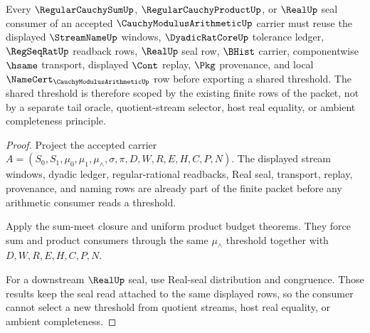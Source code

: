 \begin{theorem}
\label{thm:cauchy-modulus-arithmetic-scope-window-reuse}
Every $\RegularCauchySumUp$, $\RegularCauchyProductUp$, or $\RealUp$ seal
consumer of an accepted $\CauchyModulusArithmeticUp$ carrier must reuse the
displayed $\StreamNameUp$ windows, $\DyadicRatCoreUp$ tolerance ledger,
$\RegSeqRatUp$ readback rows, $\RealUp$ seal row, $\BHist$ carrier,
componentwise $\hsame$ transport, displayed $\Cont$ replay, $\Pkg$ provenance,
and local $\NameCert_{\CauchyModulusArithmeticUp}$ row before exporting a
shared threshold. The shared threshold is therefore scoped by the existing
finite rows of the packet, not by a separate tail oracle, quotient-stream
selector, host real equality, or ambient completeness principle.
\end{theorem}
\begin{proof}
Project the accepted carrier
$A=(S_0,S_1,\mu_0,\mu_1,\mu_{\wedge},\sigma,\pi,D,W,R,E,H,C,P,N)$. The
displayed stream windows, dyadic ledger, regular-rational readbacks, Real seal,
transport, replay, provenance, and naming rows are already part of the finite
packet before any arithmetic consumer reads a threshold.

Apply the sum-meet closure and uniform product budget theorems. They force sum
and product consumers through the same $\mu_{\wedge}$ threshold together with
$D,W,R,E,H,C,P,N$.

For a downstream $\RealUp$ seal, use Real-seal distribution and congruence.
Those results keep the seal read attached to the same displayed rows, so the
consumer cannot select a new threshold from quotient streams, host real
  equality, or ambient completeness.
\end{proof}


